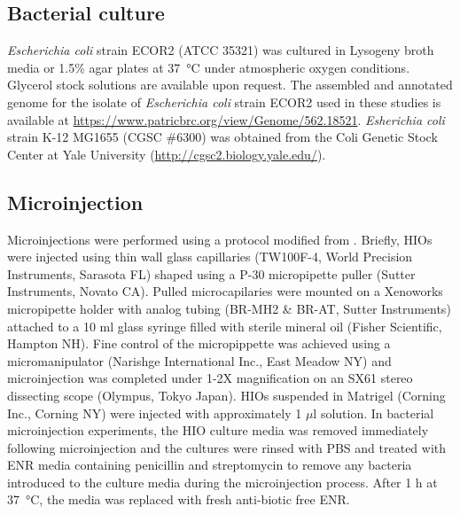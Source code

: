 \documentclass[9pt,lineo]{elife}
\begin{document}
\subsection*{{\bfseries\sffamily } Bacterial culture}
\label{sec:orgheadline16}
\emph{Escherichia coli} strain ECOR2 (ATCC 35321) was cultured in Lysogeny broth media or 1.5\% agar plates at \SI{37}{\celsius} under atmospheric oxygen conditions. Glycerol stock solutions are available upon request. The assembled and annotated genome for the isolate of \emph{Escherichia coli} strain ECOR2 used in these studies is available at \url{https://www.patricbrc.org/view/Genome/562.18521}. \emph{Esherichia coli} strain K-12 MG1655 (CGSC \#6300) was obtained from the Coli Genetic Stock Center at Yale University (\url{http://cgsc2.biology.yale.edu/}).
\subsection*{{\bfseries\sffamily } Microinjection}
\label{sec:orgheadline17}
Microinjections were performed using a protocol modified from \citet{Leslie:2015}. Briefly, HIOs were injected using thin wall glass capillaries (TW100F-4, World Precision Instruments, Sarasota FL) shaped using a P-30 micropipette puller (Sutter Instruments, Novato CA). Pulled microcapilaries were mounted on a Xenoworks micropipette holder with analog tubing (BR-MH2 \& BR-AT, Sutter Instruments) attached to a 10 ml glass syringe filled with sterile mineral oil (Fisher Scientific, Hampton NH). Fine control of the micropippette was achieved using a micromanipulator (Narishge International Inc., East Meadow NY) and microinjection was completed under 1-2X magnification on an SX61 stereo dissecting scope (Olympus, Tokyo Japan). HIOs suspended in Matrigel (Corning Inc., Corning NY) were injected with approximately 1 \(\mu\)l solution. In bacterial microinjection experiments, the HIO culture media was removed immediately following microinjection and the cultures were rinsed with PBS and treated with ENR media containing penicillin and streptomycin to remove any bacteria introduced to the culture media during the microinjection process. After 1 h at \SI{37}{\celsius}, the media was replaced with fresh anti-biotic free ENR.
\end{document}
